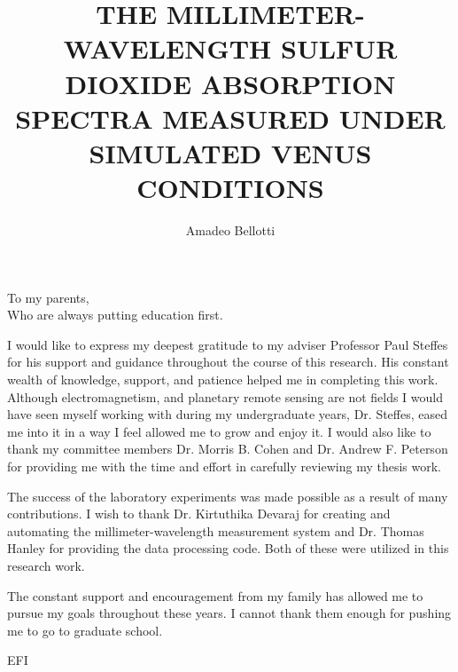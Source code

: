 \documentclass[12pt]{gatech-thesis}
\title{THE MILLIMETER-WAVELENGTH SULFUR DIOXIDE ABSORPTION SPECTRA MEASURED UNDER SIMULATED VENUS CONDITIONS} %
\author{Amadeo Bellotti}
\numberwithin{equation}{chapter}
\numberwithin{figure}{chapter}
\begin{document}

\begin{preliminary}
\begin{dedication}
\null\vfil
{\large
\begin{center}
To my parents,\\\vspace{12pt}
Who are always putting education first.
\end{center}}
\vfil\null
\end{dedication}
\begin{acknowledgements}
I would like to express my deepest gratitude to my adviser Professor Paul Steffes for his support and guidance throughout the course of this research. His constant wealth of knowledge, support, and patience helped me in completing this work. Although electromagnetism, and planetary remote sensing are not fields I would have seen myself working with during my undergraduate years, Dr. Steffes, eased me into it in a way I feel allowed me to grow and enjoy it. I would also like to thank my committee members Dr. Morris B. Cohen and Dr. Andrew F. Peterson for providing me with the time and effort in carefully reviewing my thesis work.

The success of the laboratory experiments was made possible as a result of many contributions. I wish to thank Dr. Kirtuthika Devaraj for creating and automating the millimeter-wavelength measurement system and Dr. Thomas Hanley for providing the data processing code. Both of these were utilized in this research work. 

The constant support and encouragement from my family has allowed me to pursue my goals throughout these years. I cannot thank them enough for pushing me to go to graduate school. 
\end{acknowledgements}
\contents

\end{preliminary}
EFI

%

%




\appendix

\end{document}
